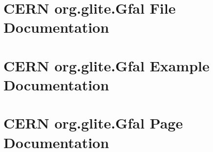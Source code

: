 \documentclass[a4paper]{book}
\begin{document}
\chapter{CERN org.glite.Gfal File Documentation}


































































\chapter{CERN org.glite.Gfal Example Documentation}






\chapter{CERN org.glite.Gfal Page Documentation}




\printindex
\end{document}
